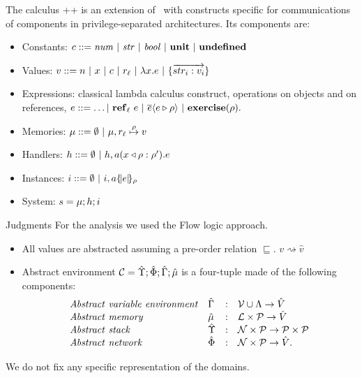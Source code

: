 \documentclass[11pt]{beamer}
\begin{document}
\begin{frame}{The calculus}
\ljs++ is an extension of \ljs\ with constructs specific for communications of components in privilege-separated architectures. Its components are:

\begin{itemize}
\item Constants: $c ::= \mathit{num} ~|~ \mathit{str} ~|~ \mathit{bool} ~|~ \unit ~|~ \undef$
\item Values: $v ::= n ~|~ x ~|~ c ~|~ r_{\ell} ~|~ \lam{x}{e} ~|~ \rec{\vec{str_i:v_i}}$
\item Expressions: classical lambda calculus construct, operations on objects and on references, $e ::= \dots |~ \newref{\ell}{e} ~|~ \send{e}{e}{\rho} ~|~ \exercise{\rho}.$
\item Memories: $\mu ::= \emptyset ~|~ \mu, \map{r_{\ell}}{\rho}{v}$
\item Handlers: $h ::= \emptyset ~|~ h,\handler{a}{x}{\rho}{e}{\rho'}$
\item Instances: $i ::= \emptyset ~|~ i,\inst{a}{e}{\rho}$
\item System: $s = \sys{\mu}{h}{i}$
\end{itemize}
\end{frame}

\begin{frame}{Judgments}
For the analysis we used the Flow logic \cite{FlowLogic} approach.
\begin{itemize}
\item All values are abstracted assuming a pre-order relation $\sqsubseteq$. $v \rightsquigarrow \hat{v}$
\item Abstract environment $\absC=\abstack ; \absnet ; \absenv ; \absmem$ is a four-tuple made of the following components:
$$
\begin{array}{llcl}
\mathit{Abstract\ variable\ environment} & \absenv & : & \vars \cup \absfuns \rightarrow \absvalues \\
\mathit{Abstract\ memory} & \absmem & : & \labs \times \perms \rightarrow \absvalues \\
\mathit{Abstract\ stack} & \abstack & : & \names \times \perms \rightarrow \perms \times \perms \\
\mathit{Abstract\ network} & \absnet & : & \names \times \perms \rightarrow \absvalues.
\end{array}
$$
\end{itemize}
We do not fix any specific representation of the domains.
\end{frame}
\end{document}
